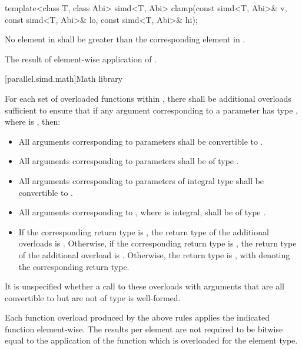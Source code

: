 \begin{itemdecl}
template<class T, class Abi> simd<T, Abi>
  clamp(const simd<T, Abi>& v, const simd<T, Abi>& lo, const simd<T, Abi>& hi);
\end{itemdecl}

\begin{itemdescr}
  \pnum\requires
  No element in  shall be greater than the corresponding element in .

  \pnum\returns
  The result of element-wise application of  \foralli.
\end{itemdescr}

[parallel.simd.math]{Math library}

\pnum
For each set of overloaded functions within , there shall be additional overloads sufficient to ensure that if any argument corresponding to a  parameter has type , where  is , then:
\begin{itemize}
  \item All arguments corresponding to  parameters shall be convertible to .
  \item All arguments corresponding to  parameters shall be of type .
  \item All arguments corresponding to parameters of integral type  shall be convertible to .
  \item All arguments corresponding to , where  is integral, shall be of type .
  \item If the corresponding return type is , the return type of the additional overloads is . Otherwise, if the corresponding return type is , the return type of the additional overload is . Otherwise, the return type is , with  denoting the corresponding return type.
\end{itemize}
It is unspecified whether a call to these overloads with arguments that are all convertible to  but are not of type  is well-formed.

\pnum
Each function overload produced by the above rules applies the indicated  function element-wise. The results per element are not required to be bitwise equal to the application of the function which is overloaded for the element type.

